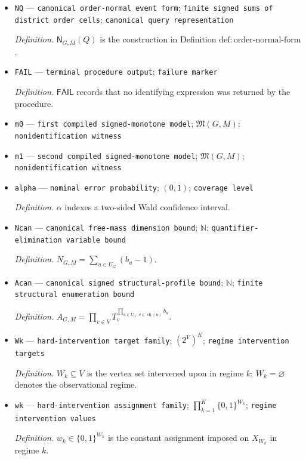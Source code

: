 \documentclass{article}
\begin{document}
\begin{itemize}
  \item \texttt{NQ} --- \texttt{canonical order-\allowbreak{}normal event form}; \texttt{finite signed sums of district order cells}; \texttt{canonical query representation}
  \par\smallskip\noindent\emph{Definition.} \(\mathsf N_{G,M}(Q)\) is the construction in Definition \(\mathrm{def:order\text{-}normal\text{-}form}\).
  \item \texttt{FAIL} --- \texttt{terminal procedure output}; \texttt{failure marker}
  \par\smallskip\noindent\emph{Definition.} \(\mathsf{FAIL}\) records that no identifying expression was returned by the procedure.
  \item \texttt{m0} --- \texttt{first compiled signed-\allowbreak{}monotone model}; \(\mathfrak M(G,M)\); \texttt{nonidentification witness}
  \item \texttt{m1} --- \texttt{second compiled signed-\allowbreak{}monotone model}; \(\mathfrak M(G,M)\); \texttt{nonidentification witness}
  \item \texttt{alpha} --- \texttt{nominal error probability}; \((0,1)\); \texttt{coverage level}
  \par\smallskip\noindent\emph{Definition.} \(\alpha\) indexes a two-sided Wald confidence interval.
  \item \texttt{Ncan} --- \texttt{canonical free-\allowbreak{}mass dimension bound}; \(\mathbb N\); \texttt{quantifier-\allowbreak{}elimination variable bound}
  \par\smallskip\noindent\emph{Definition.} \(N_{G,M}=\sum_{u\in U_G}(b_u-1)\).
  \item \texttt{Acan} --- \texttt{canonical signed structural-\allowbreak{}profile bound}; \(\mathbb N\); \texttt{finite structural enumeration bound}
  \par\smallskip\noindent\emph{Definition.} \(A_{G,M}=\prod_{v\in V}T_v^{\prod_{u\in U_G:\,v\in\operatorname{ch}(u)}b_u}\).
  \item \texttt{Wk} --- \texttt{hard-\allowbreak{}intervention target family}; \((2^V)^K\); \texttt{regime intervention targets}
  \par\smallskip\noindent\emph{Definition.} \(W_k\subseteq V\) is the vertex set intervened upon in regime \(k\); \(W_k=\varnothing\) denotes the observational regime.
  \item \texttt{wk} --- \texttt{hard-\allowbreak{}intervention assignment family}; \(\prod_{k=1}^{K}\{0,1\}^{W_k}\); \texttt{regime intervention values}
  \par\smallskip\noindent\emph{Definition.} \(w_k\in\{0,1\}^{W_k}\) is the constant assignment imposed on \(X_{W_k}\) in regime \(k\).

\end{itemize}
\end{document}
